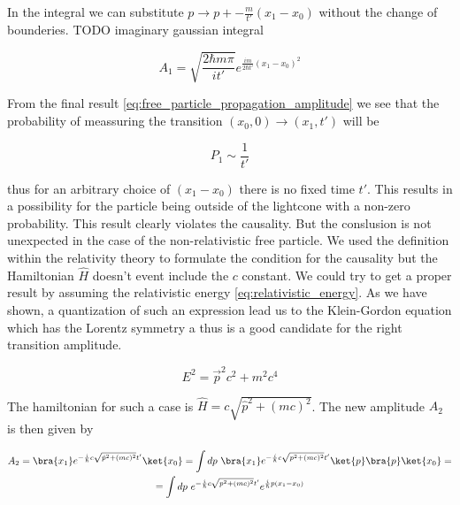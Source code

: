 In the integral we can substitute $p \to p + - \frac{m}{t'}(x_{1} - x_{0})$ without the change of bounderies. TODO imaginary gaussian integral

\begin{equation}
    \label{eq:free_particle_propagation_amplitude}
    A_{1} = \sqrt{\frac{2 \hbar m \pi}{i t'}} e^{\frac{im}{2\hbar t'} (x_{1} - x_{0})^{2}}
\end{equation}

From the final result \ref{eq:free_particle_propagation_amplitude}  we see that the probability of meassuring the
transition $(x_{0}, 0) \to (x_{1}, t')$ will be

\begin{equation*}
    P_{1} \sim \frac{1}{t'}
\end{equation*}

thus for an arbitrary choice of $(x_{1} - x_{0})$ there is no fixed time $t'$. This results in a possibility for the particle
being outside of the lightcone with a non-zero probability. This result clearly violates the causality. But the conslusion is
not unexpected in the case of the non-relativistic free particle. We used the definition within the relativity theory to 
formulate the condition for the causality but the Hamiltonian $\hat{H}$ doesn't event include the $c$ constant. We could try
to get a proper result by assuming the relativistic energy \ref{eq:relativistic_energy}. As we have shown, a quantization of such an
expression lead us to the Klein-Gordon equation which has the Lorentz symmetry a thus is a good candidate for the right transition
amplitude.

\begin{equation}
    \label{eq:relativistic_energy}
    E^{2} = \vec{p}^{2} c^{2} + m^{2} c^{4}
\end{equation}

The hamiltonian for such a case is $\hat{H} = c\sqrt{\hat{p}^{2} + (mc)^{2}}$. The new amplitude $A_{2}$ is then given by

\begin{equation*}
    \begin{gathered}
        A_{2} = \bra{x_{1}} e^{- \frac{i}{\hbar} c\sqrt{\hat{p}^{2} + (mc)^{2}} t'}\ket{x_{0}} = \int dp \ \bra{x_{1}} e^{- \frac{i}{\hbar} c \sqrt{p^{2} + (mc)^{2}} t'} \ket{p} \bra{p} \ket{x_{0}} = \\
        = \int dp \ e^{- \frac{i}{\hbar} c \sqrt{p^{2} + (mc)^{2}} t'} e^{\frac{i}{\hbar}p (x_{1} - x_{0})}
    \end{gathered}
\end{equation*}

